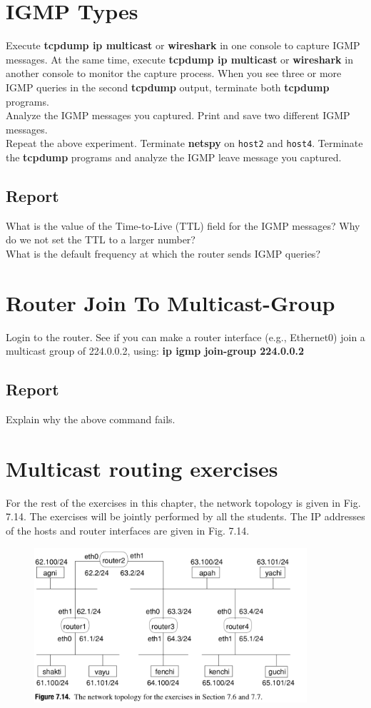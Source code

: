 \documentclass[10pt,a4paper]{article}
\numberwithin{equation}{section}
\numberwithin{figure}{section}
\numberwithin{table}{section}
\begin{document}
\section{IGMP Types}
    Execute \textbf{tcpdump ip multicast} or \textbf{wireshark} in one console to capture IGMP messages.
    At the same time, execute \textbf{tcpdump ip multicast} or \textbf{wireshark} in another console to monitor the capture process.
    When you see three or more IGMP queries in the second \textbf{tcpdump} output, terminate both \textbf{tcpdump} programs. \\
    Analyze the IGMP messages you captured.
    Print and save two different IGMP messages. \\
    Repeat the above experiment.
    Terminate \textbf{netspy} on \texttt{host2} and \texttt{host4}.
    Terminate the \textbf{tcpdump} programs and analyze the IGMP leave message you captured.
    \subsection*{Report}
    What is the value of the Time-to-Live (TTL) field for the IGMP messages?
    Why do we not set the TTL to a larger number? \\
    What is the default frequency at which the router sends IGMP queries?

\section{Router Join To Multicast-Group}
    Login to the router.
    See if you can make a router interface (e.g., Ethernet0) join a multicast group of 224.0.0.2, using:
    \textbf{ip igmp join-group 224.0.0.2}
    \subsection*{Report}
    Explain why the above command fails.

\section*{Multicast routing exercises}
    For the rest of the exercises in this chapter, the network topology is given in Fig. 7.14. The exercises will be jointly performed by all the students. The IP addresses of the hosts and router interfaces are given in Fig. 7.14.
    \begin{figure}[H]
        \centering
        \includegraphics[width=0.9\textwidth]{img/figure7-14.png}
        \label{fig:7.14}
    \end{figure}
\end{document}
